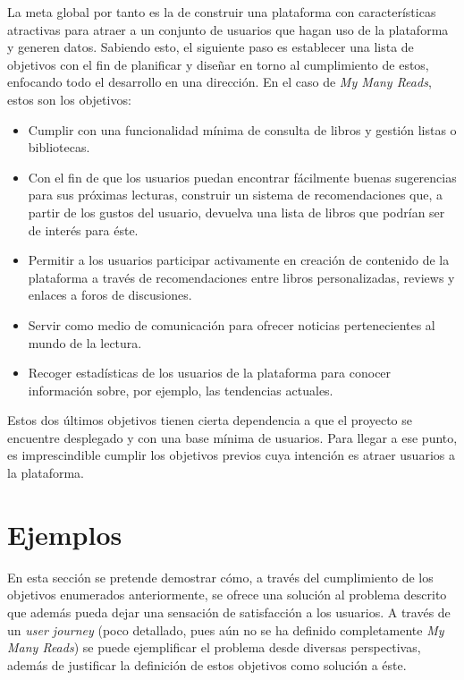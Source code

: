 La meta global por tanto es la de construir una plataforma con características atractivas para atraer a un conjunto de usuarios que hagan uso de la plataforma y generen datos. Sabiendo esto, el siguiente paso es establecer una lista de objetivos con el fin de planificar y diseñar en torno al cumplimiento de estos, enfocando todo el desarrollo en una dirección. En el caso de \textit{My Many Reads}, estos son los objetivos:

\begin{itemize}
    \item Cumplir con una funcionalidad mínima de consulta de libros y gestión listas o bibliotecas.
    \item Con el fin de que los usuarios puedan encontrar fácilmente buenas sugerencias para sus próximas lecturas, construir un sistema de recomendaciones que, a partir de los gustos del usuario, devuelva una lista de libros que podrían ser de interés para éste.
    \item Permitir a los usuarios participar activamente en creación de contenido de la plataforma a través de recomendaciones entre libros personalizadas, reviews y enlaces a foros de discusiones.
    \item Servir como medio de comunicación para ofrecer noticias pertenecientes al mundo de la lectura.
    \item Recoger estadísticas de los usuarios de la plataforma para conocer información sobre, por ejemplo, las tendencias actuales.
\end{itemize}

Estos dos últimos objetivos tienen cierta dependencia a que el proyecto se encuentre desplegado y con una base mínima de usuarios. Para llegar a ese punto, es imprescindible cumplir los objetivos previos cuya intención es atraer usuarios a la plataforma.

\section{Ejemplos}

En esta sección se pretende demostrar cómo, a través del cumplimiento de los objetivos enumerados anteriormente, se ofrece una solución al problema descrito que además pueda dejar una sensación de satisfacción a los usuarios. A través de un \textit{user journey} (poco detallado, pues aún no se ha definido completamente \textit{My Many Reads}) se puede ejemplificar el problema desde diversas perspectivas, además de justificar la definición de estos objetivos como solución a éste.


